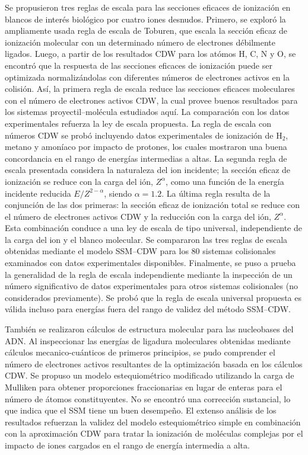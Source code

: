 Se propusieron tres reglas de escala para las secciones eficaces de 
ionización en blancos de interés biológico por cuatro iones desnudos. 
Primero, se exploró la ampliamente usada regla de escala de Toburen, que 
escala la sección eficaz de ionización molecular con un determinado 
número de electrones débilmente ligados. Luego, a partir de los 
resultados CDW para los atómos H, C, N y O, se encontró que la respuesta 
de las secciones eficaces de ionización puede ser optimizada 
normalizándolas con diferentes números de electrones activos en la 
colisión. Así, la primera regla de escala reduce las secciones eficaces 
moleculares con el número de electrones activos CDW, la cual provee 
buenos resultados para los sistemas proyectil--molécula estudiados aquí. 
La comparación con los datos experimentales refuerza la ley de escala 
propuesta. La regla de escala con números CDW se probó incluyendo datos 
experimentales de ionización de H$_2$, metano y amoníaco por impacto de 
protones, los cuales mostraron una buena concordancia en el rango de 
energías intermedias a altas. La segunda regla de escala presentada  
considera la naturaleza del ion incidente; la sección eficaz de 
ionización se reduce con la carga del ión, $Z^{\alpha}$, como una 
función de la energía incidente reducida $E/Z^{2-\alpha}$, siendo 
$\alpha=1.2$. La última regla resulta de la conjunción de las dos 
primeras: la sección eficaz de ionización total se reduce con el número 
de electrones activos CDW y la reducción con la carga del ión, 
$Z^{\alpha}$. Esta combinación conduce a una ley de escala de tipo 
universal, independiente de la carga del ion y el blanco molecular. Se 
compararon las tres reglas de escala obtenidas mediante el modelo 
SSM--CDW para los 80 sistemas colisionales examinados con datos 
experimentales disponibles. Finalmente, se puso a prueba la generalidad 
de la regla de escala independiente mediante la inspección de un número 
significativo de datos experimentales para otros sistemas colisionales 
(no considerados previamente). Se probó que la regla de escala universal 
propuesta es válida incluso para energías fuera del rango de validez del 
método SSM--CDW.

También se realizaron cálculos de estructura molecular para las 
nucleobases del ADN. Al inspeccionar las energías de ligadura moleculares 
obtenidas mediante cálculos mecanico-cuánticos de primeros principios, 
se pudo comprender el número de electrones activos resultantes de la 
optimización basada en los cálculos CDW. Se propuso un modelo 
estequiométrico modificado utilizando la carga de Mulliken para obtener 
proporciones fraccionarias en lugar de enteras para el número de átomos 
constituyentes. No se encontró una corrección sustancial, lo que indica 
que el SSM tiene un buen desempeño. El extenso análisis de los 
resultados refuerzan la validez del modelo estequiométrico simple en 
combinación con la aproximación CDW para tratar la ionización de 
moléculas complejas por el impacto de iones cargados en el rango de 
energía intermedia a alta. 


